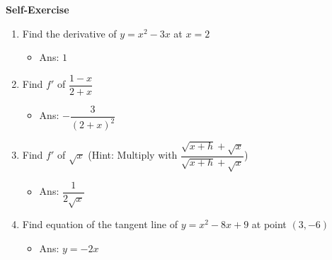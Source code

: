 \documentclass[t]{beamer}
\theoremstyle{plain}
\theoremstyle{definition}
\newcounter{heading}
\newcommand{\makeheading}[1]{\medskip\begin{large}\noindent\textbf{{#1}}\end{large}\smallskip}
\begin{document}
\begin{frame}
\makeheading{Self-Exercise}

\begin{enumerate}

\item Find the derivative of $y = x^2 - 3x$ at $x = 2$ 
\begin{itemize}
	\item Ans: $1$
\end{itemize}

\item Find $f'$ of $\dfrac{1-x}{2+x}$ 
\begin{itemize}
	\item Ans: $-\dfrac{3}{(2+x)^2}$
\end{itemize}

\item Find $f'$ of $\sqrt{x}$  \qquad (Hint: Multiply with $\dfrac{\sqrt{x + h} + \sqrt{x}}{\sqrt{x + h} + \sqrt{x}}$)
\begin{itemize}
	\item Ans: $\dfrac{1}{2\sqrt{x}}$
\end{itemize}

\item Find equation of the tangent line of $y = x^2 - 8x + 9$ at point $(3, -6)$
\begin{itemize}
	\item Ans: $y = -2x$
\end{itemize}

\end{enumerate}

\end{frame}


%
%
\end{document}
